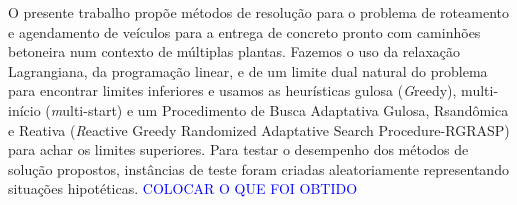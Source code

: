 O presente trabalho propõe métodos de resolução para o problema de roteamento e agendamento de veículos para a entrega de concreto pronto com caminhões betoneira num contexto de múltiplas plantas. 
Fazemos o uso da relaxação Lagrangiana, da programação linear, e de um limite dual natural do problema para encontrar limites inferiores e usamos as heurísticas gulosa ({\textit Greedy}), multi-início ({\textit multi-start}) e 
  um Procedimento de Busca Adaptativa Gulosa, Rsandômica e Reativa ({\textit Reactive Greedy Randomized Adaptative Search Procedure-RGRASP}) para achar os limites superiores. Para testar o desempenho dos
  métodos de solução propostos, instâncias de teste foram criadas aleatoriamente representando situações hipotéticas. \textcolor{blue}{COLOCAR O QUE FOI OBTIDO}